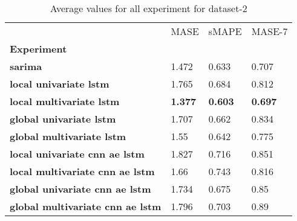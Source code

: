 \begin{table}[H]
\centering
\caption{Average values for all experiment for dataset-2}
\label{table:Average-metric-dataset-2}
\begin{tabular}{llll}
\toprule
{} &            MASE &           sMAPE &          MASE-7 \\
\textbf{Experiment                     } &                 &                 &                 \\
\midrule
\textbf{sarima                         } &           1.472 &           0.633 &           0.707 \\
\textbf{local univariate lstm          } &           1.765 &           0.684 &           0.812 \\
\textbf{local multivariate lstm        } &  \textbf{1.377} &  \textbf{0.603} &  \textbf{0.697} \\
\textbf{global univariate lstm         } &           1.707 &           0.662 &           0.834 \\
\textbf{global multivariate lstm       } &            1.55 &           0.642 &           0.775 \\
\textbf{local univariate cnn ae lstm   } &           1.827 &           0.716 &           0.851 \\
\textbf{local multivariate cnn ae lstm } &            1.66 &           0.743 &           0.816 \\
\textbf{global univariate cnn ae lstm  } &           1.734 &           0.675 &            0.85 \\
\textbf{global multivariate cnn ae lstm} &           1.796 &           0.703 &            0.89 \\
\bottomrule
\end{tabular}
\end{table}
